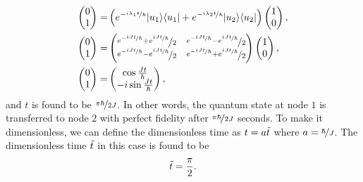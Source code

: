 \documentclass[reprint, aps, 12pt, floatfix]{revtex4-2}
\begin{document}
\begin{align}
    \begin{pmatrix}
        0\\
        1
    \end{pmatrix}=&\left(e^{-\nicefrac{i\lambda_1t}{\hbar}}|u_1\rangle\langle u_1|+e^{-\nicefrac{i\lambda_2t}{\hbar}}|u_2\rangle\langle u_2|\right)\begin{pmatrix}
        1\\
        0
    \end{pmatrix},\nonumber\\
    \begin{pmatrix}
        0\\
        1
    \end{pmatrix}=&\begin{pmatrix}
        \nicefrac{e^{-\nicefrac{iJt}{\hbar}}+e^{\nicefrac{iJt}{\hbar}}}{2}&\nicefrac{e^{-\nicefrac{iJt}{\hbar}}-e^{\nicefrac{iJt}{\hbar}}}{2}\\
        \nicefrac{e^{-\nicefrac{iJt}{\hbar}}-e^{\nicefrac{iJt}{\hbar}}}{2}&\nicefrac{e^{-\nicefrac{iJt}{\hbar}}+e^{\nicefrac{iJt}{\hbar}}}{2}
    \end{pmatrix}\begin{pmatrix}
        1\\
        0
    \end{pmatrix},\nonumber\\
    \begin{pmatrix}
        0\\
        1
    \end{pmatrix}=&\begin{pmatrix}
        \cos{\frac{Jt}{\hbar}}\\
        -i\sin{\frac{Jt}{\hbar}}
    \end{pmatrix},
\end{align}
and $t$ is found to be $\nicefrac{\pi\hbar}{2J}$. In other words, the quantum state at node $1$ is transferred to node $2$ with perfect fidelity after $\nicefrac{\pi\hbar}{2J}$ seconds. To make it dimensionless, we can define the dimensionless time as $t=a\Tilde{t}$ where $a=\nicefrac{\hbar}{J}$. The dimensionless time $\Tilde{t}$ in this case is found to be
\begin{equation}
    \Tilde{t}=\frac{\pi}{2}.
\end{equation}
\end{document}
